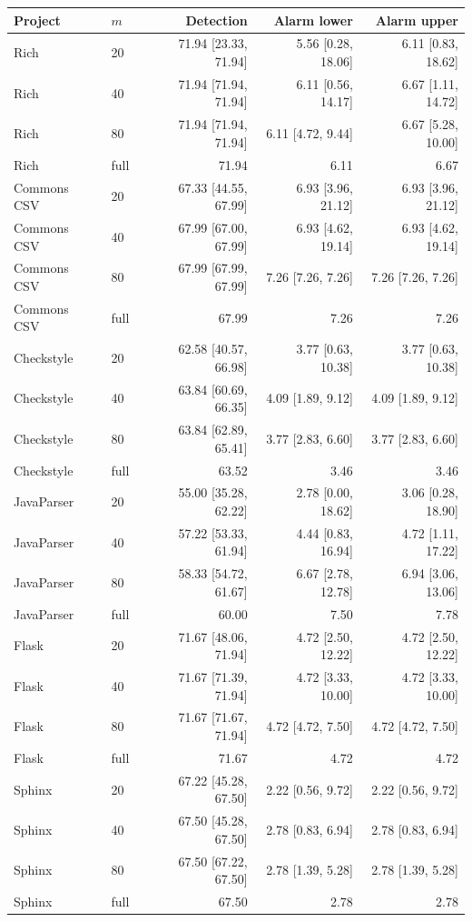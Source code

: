 \begin{tabular}{llrrr}
\toprule
Project & $m$ & Detection & Alarm lower & Alarm upper \\
\midrule
Rich & 20 & 71.94 [23.33, 71.94] & 5.56 [0.28, 18.06] & 6.11 [0.83, 18.62] \\
Rich & 40 & 71.94 [71.94, 71.94] & 6.11 [0.56, 14.17] & 6.67 [1.11, 14.72] \\
Rich & 80 & 71.94 [71.94, 71.94] & 6.11 [4.72, 9.44] & 6.67 [5.28, 10.00] \\
Rich & full & 71.94 & 6.11 & 6.67 \\
Commons CSV & 20 & 67.33 [44.55, 67.99] & 6.93 [3.96, 21.12] & 6.93 [3.96, 21.12] \\
Commons CSV & 40 & 67.99 [67.00, 67.99] & 6.93 [4.62, 19.14] & 6.93 [4.62, 19.14] \\
Commons CSV & 80 & 67.99 [67.99, 67.99] & 7.26 [7.26, 7.26] & 7.26 [7.26, 7.26] \\
Commons CSV & full & 67.99 & 7.26 & 7.26 \\
Checkstyle & 20 & 62.58 [40.57, 66.98] & 3.77 [0.63, 10.38] & 3.77 [0.63, 10.38] \\
Checkstyle & 40 & 63.84 [60.69, 66.35] & 4.09 [1.89, 9.12] & 4.09 [1.89, 9.12] \\
Checkstyle & 80 & 63.84 [62.89, 65.41] & 3.77 [2.83, 6.60] & 3.77 [2.83, 6.60] \\
Checkstyle & full & 63.52 & 3.46 & 3.46 \\
JavaParser & 20 & 55.00 [35.28, 62.22] & 2.78 [0.00, 18.62] & 3.06 [0.28, 18.90] \\
JavaParser & 40 & 57.22 [53.33, 61.94] & 4.44 [0.83, 16.94] & 4.72 [1.11, 17.22] \\
JavaParser & 80 & 58.33 [54.72, 61.67] & 6.67 [2.78, 12.78] & 6.94 [3.06, 13.06] \\
JavaParser & full & 60.00 & 7.50 & 7.78 \\
Flask & 20 & 71.67 [48.06, 71.94] & 4.72 [2.50, 12.22] & 4.72 [2.50, 12.22] \\
Flask & 40 & 71.67 [71.39, 71.94] & 4.72 [3.33, 10.00] & 4.72 [3.33, 10.00] \\
Flask & 80 & 71.67 [71.67, 71.94] & 4.72 [4.72, 7.50] & 4.72 [4.72, 7.50] \\
Flask & full & 71.67 & 4.72 & 4.72 \\
Sphinx & 20 & 67.22 [45.28, 67.50] & 2.22 [0.56, 9.72] & 2.22 [0.56, 9.72] \\
Sphinx & 40 & 67.50 [45.28, 67.50] & 2.78 [0.83, 6.94] & 2.78 [0.83, 6.94] \\
Sphinx & 80 & 67.50 [67.22, 67.50] & 2.78 [1.39, 5.28] & 2.78 [1.39, 5.28] \\
Sphinx & full & 67.50 & 2.78 & 2.78 \\
\bottomrule
\end{tabular}
